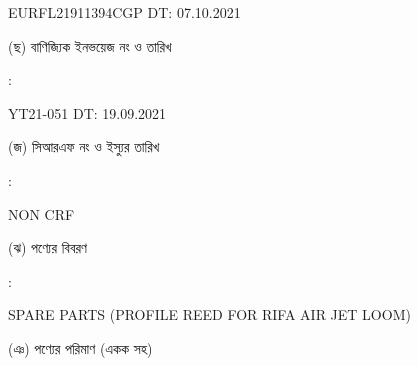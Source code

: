 \documentclass[12pt]{article}
\newcommand{\good}{SPARE PARTS (PROFILE REED FOR RIFA AIR JET LOOM)}
\newcommand{\blno}{EURFL21911394CGP}
\newcommand{\bldt}{07.10.2021}
\newcommand{\invno}{YT21-051}
\newcommand{\invdt}{19.09.2021}
\newcommand{\crf}{NON CRF}
\newcommand{\crfdt}{}
\begin{document}
\begin{minipage}[t]{0.50\linewidth}
{\blno} \hspace{2em} DT: {\bldt}
\\
\end{minipage}
\begin{minipage}[t]{0.05\linewidth}
\hspace*{1em}
\end{minipage}
\begin{minipage}[t]{0.45\linewidth}
(ছ) বাণিজ্যিক ইনভয়েজ নং ও তারিখ
\end{minipage}
\begin{minipage}[t]{0.02\linewidth}
:
\end{minipage}
\begin{minipage}[t]{0.50\linewidth}
{\invno} \hspace{2em} DT: {\invdt}
\\
\end{minipage}
\begin{minipage}[t]{0.05\linewidth}
\hspace*{1em}
\end{minipage}
\begin{minipage}[t]{0.45\linewidth}
(জ) সিআরএফ নং ও ইস্যুর তারিখ
\end{minipage}
\begin{minipage}[t]{0.02\linewidth}
:
\end{minipage}
\begin{minipage}[t]{0.50\linewidth}
{\crf} \hspace{2em} {\crfdt}
\\
\end{minipage}
\begin{minipage}[t]{0.05\linewidth}
\hspace*{1em}
\end{minipage}
\begin{minipage}[t]{0.45\linewidth}
(ঝ) পণ্যের বিবরণ
\end{minipage}
\begin{minipage}[t]{0.02\linewidth}
:
\end{minipage}
\begin{minipage}[t]{0.50\linewidth}
{\good}
\\
\end{minipage}
\begin{minipage}[t]{0.05\linewidth}
\hspace*{1em}
\end{minipage}
\begin{minipage}[t]{0.45\linewidth}
(ঞ) পণ্যের পরিমাণ (একক সহ)
\end{minipage}
\end{document}
